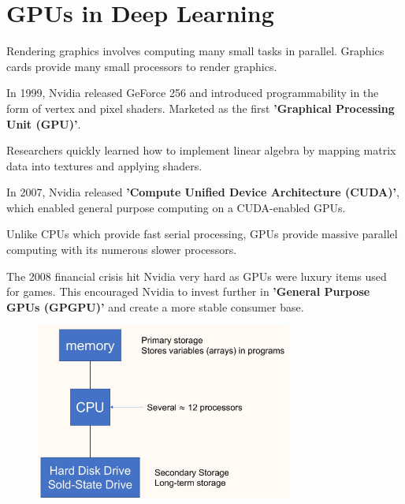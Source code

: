 \section{GPUs in Deep Learning}

\begin{concept}
    Rendering graphics involves computing many small tasks in parallel. Graphics cards provide many small processors to render graphics.

    In 1999, Nvidia released GeForce 256 and introduced programmability in the form of vertex and pixel shaders. Marketed as the first \textbf{'Graphical Processing Unit (GPU)'}.

    Researchers quickly learned how to implement linear algebra by mapping matrix data into textures and applying shaders.

    In 2007, Nvidia released \textbf{'Compute Unified Device Architecture (CUDA)'}, which enabled general purpose computing on a CUDA-enabled GPUs.

    Unlike CPUs which provide fast serial processing, GPUs provide massive parallel computing with its numerous slower processors.

    The 2008 financial crisis hit Nvidia very hard as GPUs were luxury items used for games. This encouraged Nvidia to invest further in \textbf{'General Purpose GPUs (GPGPU)'} and create a more stable consumer base.
\end{concept}

\begin{concept}
    \begin{figure}[H]
        \centering
        \includegraphics[width=0.75\textwidth]{.././assets/4.6.jpg}
    \end{figure}
\end{concept}

